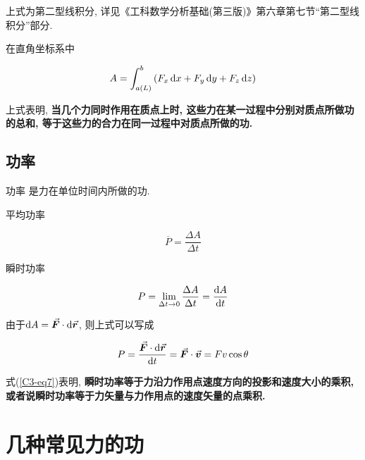 \begin{note}
	上式为第二型线积分, 详见《工科数学分析基础(第三版)》第六章第七节“第二型线积分”部分. 
\end{note}

在直角坐标系中

\begin{equation}
	A = \int_{a(L)}^{b} \qty(F_x \dd{x} + F_y \dd{y} + F_z \dd{z}) \label{C3-eq4}
\end{equation}

上式表明, \textbf{当几个力同时作用在质点上时, 这些力在某一过程中分别对质点所做功的总和, 等于这些力的合力在同一过程中对质点所做的功. }

\subsection{功率}

\begin{definition}[功率] \label{C3-df1}
	
	{\heiti 功率} 是力在单位时间内所做的功. 
	
	平均功率
	
	\begin{equation}
		\overline{P} = \dfrac{\Delta A}{\Delta t} \label{C3-eq5}
	\end{equation}

    瞬时功率
    
    \begin{equation}
    	P = \lim\limits_{\Delta t \to 0} \dfrac{\Delta A}{\Delta t} = \dv{A}{t} \label{C3-eq6}
    \end{equation}

    由于$\dd{A} = \va*{F} \cdot \dd{\va*{r}}$, 则上式可以写成
    
    \begin{equation}
    	P = \dfrac{\va*{F} \cdot \dd{\va*{r}}}{\dd{t}} = \va*{F} \cdot \va*{v} = F v \cos \theta \label{C3-eq7}
    \end{equation}
    
\end{definition}

式(\ref{C3-eq7})表明, \textbf{瞬时功率等于力沿力作用点速度方向的投影和速度大小的乘积, 或者说瞬时功率等于力矢量与力作用点的速度矢量的点乘积. }

\section{几种常见力的功} \label{3.2}

